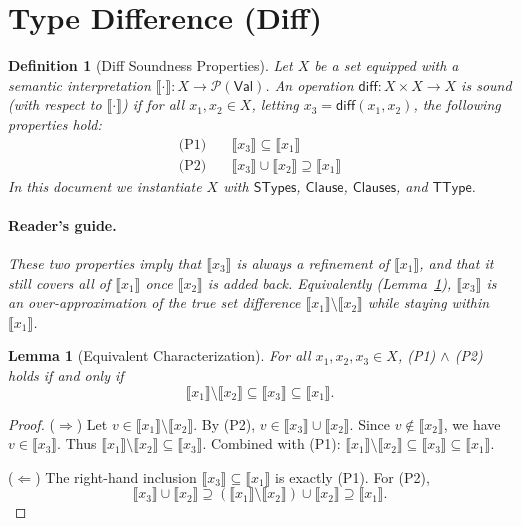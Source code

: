 \documentclass[11pt]{article}
\newtheorem{lemma}[theorem]{Lemma}
\newtheorem{definition}[theorem]{Definition}
\newcommand{\sem}[1]{\llbracket #1 \rrbracket}
\newcommand{\diff}{\mathsf{diff}}
\newcommand{\TType}{\mathsf{TType}}
\newcommand{\Clauses}{\mathsf{Clauses}}
\newcommand{\Clause}{\mathsf{Clause}}
\newcommand{\STypes}{\mathsf{STypes}}
\newcommand{\Val}{\mathsf{Val}}
\begin{document}
\section{Type Difference (Diff)}

\begin{definition}[Diff Soundness Properties]
\label{def:diff-soundness}
Let $X$ be a set equipped with a semantic interpretation $\sem{\cdot} : X \to \mathcal{P}(\Val)$.
An operation $\diff : X \times X \to X$ is \emph{sound} (with respect to $\sem{\cdot}$) if for all $x_1,x_2 \in X$, letting $x_3 = \diff(x_1,x_2)$, the following properties hold:
\begin{align}
\text{(P1)} \quad & \sem{x_3} \subseteq \sem{x_1} \tag{under-approximation} \\
\text{(P2)} \quad & \sem{x_3} \cup \sem{x_2} \supseteq \sem{x_1} \tag{coverage}
\end{align}
In this document we instantiate $X$ with $\STypes$, $\Clause$, $\Clauses$, and $\TType$.
\paragraph{Reader's guide.}
These two properties imply that $\sem{x_3}$ is always a refinement of $\sem{x_1}$, and that it still covers all of $\sem{x_1}$ once $\sem{x_2}$ is added back.
Equivalently (Lemma~\ref{lem:diff-equiv-char}), $\sem{x_3}$ is an \emph{over-approximation} of the true set difference $\sem{x_1}\setminus\sem{x_2}$ while staying within $\sem{x_1}$.
\end{definition}

\begin{lemma}[Equivalent Characterization]
\label{lem:diff-equiv-char}
For all $x_1,x_2,x_3 \in X$, (P1) $\land$ (P2) holds if and only if
\[
\sem{x_1} \setminus \sem{x_2} \subseteq \sem{x_3} \subseteq \sem{x_1}.
\]
\end{lemma}

\begin{proof}
($\Rightarrow$) Let $v \in \sem{x_1} \setminus \sem{x_2}$. By (P2),
$v \in \sem{x_3} \cup \sem{x_2}$. Since $v \notin \sem{x_2}$, we have $v \in \sem{x_3}$.
Thus $\sem{x_1} \setminus \sem{x_2} \subseteq \sem{x_3}$. Combined with (P1):
$\sem{x_1} \setminus \sem{x_2} \subseteq \sem{x_3} \subseteq \sem{x_1}$.

($\Leftarrow$) The right-hand inclusion $\sem{x_3} \subseteq \sem{x_1}$ is exactly (P1).
For (P2),
\[
\sem{x_3} \cup \sem{x_2} \supseteq (\sem{x_1} \setminus \sem{x_2}) \cup \sem{x_2} \supseteq \sem{x_1}.
\]
\end{proof}
\end{document}
